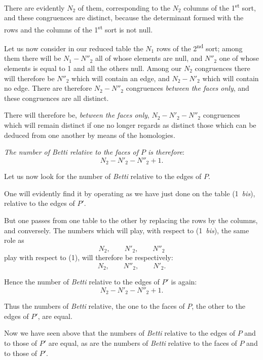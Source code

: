 \documentclass{article}
\begin{document}
There are evidently $N_{2}$ of them, corresponding to the $N_{2}$ columns of the
1\textsuperscript{st} sort, and these congruences are distinct, because the determinant formed with the rows and the columns of the 1\textsuperscript{st} sort is not null.

Let us now consider in our reduced table the $N_{1}$ rows of the 2\textsuperscript{nd} sort; among them there will be $N_{1} - N''_{2}$ all of whose elements are null, and $N''_{2}$ one of whose elements is equal to 1 and all the others null. Among our $N_{2}$ congruences there will therefore be $N''_{2}$ which will contain an edge, and $N_{2} - N'_{2}$ which will contain no edge. There are therefore $N_{2} - N''_{2}$ congruences \emph{between the faces only}, and these congruences are all distinct.

There will therefore be, \emph{between the faces only}, $N_{2} - N'_{2} - N''_{2}$ congruences which will remain distinct if one no longer regards as distinct those which can be deduced from one another by means of the homologies.

\emph{The number of Betti relative to the faces of $P$ is therefore}:
\[ N_{2} - N'_{2} - N''_{2} + 1. \]

Let us now look for the number of \emph{Betti} relative to the edges of $P$.

One will evidently find it by operating as we have just done on the table (1~\emph{bis}), relative to the edges of $P'$.

But one passes from one table to the other by replacing the rows by the columns, and conversely. The numbers which will play, with respect to (1~\emph{bis}), the same role as
\[ N_{2}, \qquad N'_{2}, \qquad N''_{2} \]
play with respect to (1), will therefore be respectively:
\[ N_{2}, \qquad N''_{2}, \qquad N'_{2}. \]

Hence the number of \emph{Betti} relative to the edges of $P'$ is again:
\[ N_{2} - N'_{2} - N''_{2} + 1. \]

Thus the numbers of \emph{Betti} relative, the one to the faces of $P$, the other to the edges of $P'$, are equal.


Now we have seen above that the numbers of \emph{Betti} relative to the edges of $P$ and to those of $P'$ are equal, as are the numbers of \emph{Betti} relative to the faces of $P$ and to those of $P'$.
\end{document}
